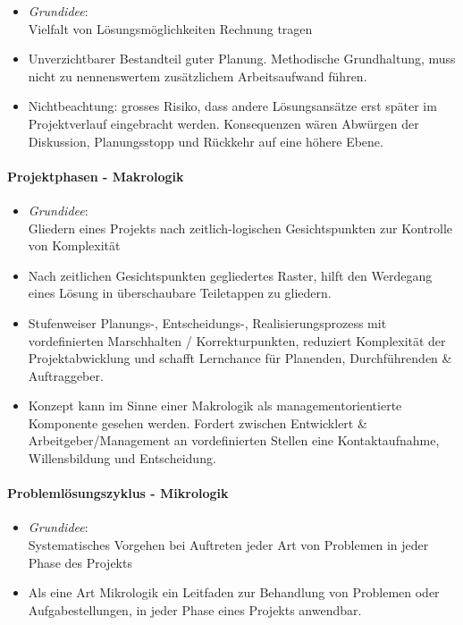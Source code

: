 \documentclass[a4paper]{article}
\begin{document}
				\begin{itemize}
					\item \textit{Grundidee}:\\
					Vielfalt von Lösungsmöglichkeiten Rechnung tragen
					\item Unverzichtbarer Bestandteil guter Planung.
					Methodische Grundhaltung, muss nicht zu nennenswertem zusätzlichem Arbeitsaufwand führen.
					\item Nichtbeachtung: grosses Risiko, dass andere Lösungsansätze erst später im Projektverlauf eingebracht werden.
					Konsequenzen wären Abwürgen der Diskussion, Planungsstopp und Rückkehr auf eine höhere Ebene.
				\end{itemize}
			
			\paragraph{Projektphasen - Makrologik}
			
				\begin{itemize}
					\item \textit{Grundidee}:\\
					Gliedern eines Projekts nach zeitlich-logischen Gesichtspunkten zur Kontrolle von Komplexität
					\item Nach zeitlichen Gesichtspunkten gegliedertes Raster, hilft den Werdegang eines Lösung in überschaubare Teiletappen zu gliedern.
					\item Stufenweiser Planungs-, Entscheidungs-, Realisierungsprozess mit vordefinierten Marschhalten / Korrekturpunkten, reduziert Komplexität der Projektabwicklung und schafft Lernchance für Planenden, Durchführenden \& Auftraggeber.
					\item Konzept kann im Sinne einer Makrologik als managementorientierte Komponente gesehen werden.
					Fordert zwischen Entwicklert \& Arbeitgeber/Management an vordefinierten Stellen eine Kontaktaufnahme, Willensbildung und Entscheidung.
				\end{itemize}
			
			\paragraph{Problemlösungszyklus - Mikrologik}
	
				\begin{itemize}
					\item \textit{Grundidee}:\\
					Systematisches Vorgehen bei Auftreten jeder Art von Problemen in jeder Phase des Projekts
					\item Als eine Art Mikrologik ein Leitfaden zur Behandlung von Problemen oder Aufgabestellungen, in jeder Phase eines Projekts anwendbar.
				\end{itemize}
	
\end{document}
